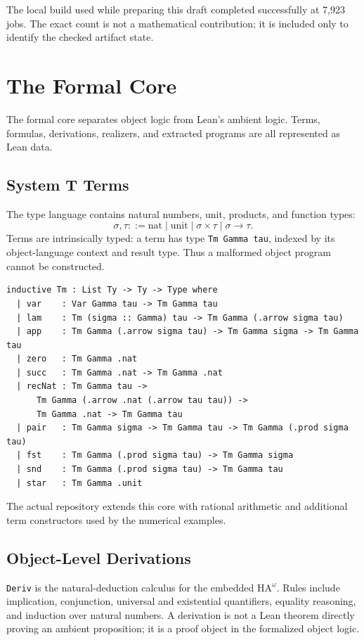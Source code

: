 \documentclass[11pt,a4paper]{article}
\theoremstyle{definition}
\theoremstyle{remark}
\newcommand{\HAomega}{\ensuremath{\mathrm{HA}^{\omega}}}
\newcommand{\lean}[1]{\texttt{\nolinkurl{#1}}}
\begin{document}
The local build used while preparing this draft completed successfully at
7,923 jobs.  The exact count is not a mathematical contribution; it is included
only to identify the checked artifact state.

\section{The Formal Core}

The formal core separates object logic from Lean's ambient logic.  Terms,
formulas, derivations, realizers, and extracted programs are all represented as
Lean data.

\subsection{System T Terms}

The type language contains natural numbers, unit, products, and function
types:
\[
  \sigma,\tau ::= \mathrm{nat}\mid \mathrm{unit}\mid
  \sigma\times\tau\mid \sigma\to\tau .
\]
Terms are intrinsically typed: a term has type \lean{Tm Gamma tau}, indexed by
its object-language context and result type.  Thus a malformed object program
cannot be constructed.

\begin{lstlisting}[language=Lean]
inductive Tm : List Ty -> Ty -> Type where
  | var    : Var Gamma tau -> Tm Gamma tau
  | lam    : Tm (sigma :: Gamma) tau -> Tm Gamma (.arrow sigma tau)
  | app    : Tm Gamma (.arrow sigma tau) -> Tm Gamma sigma -> Tm Gamma tau
  | zero   : Tm Gamma .nat
  | succ   : Tm Gamma .nat -> Tm Gamma .nat
  | recNat : Tm Gamma tau ->
      Tm Gamma (.arrow .nat (.arrow tau tau)) ->
      Tm Gamma .nat -> Tm Gamma tau
  | pair   : Tm Gamma sigma -> Tm Gamma tau -> Tm Gamma (.prod sigma tau)
  | fst    : Tm Gamma (.prod sigma tau) -> Tm Gamma sigma
  | snd    : Tm Gamma (.prod sigma tau) -> Tm Gamma tau
  | star   : Tm Gamma .unit
\end{lstlisting}

The actual repository extends this core with rational arithmetic and additional
term constructors used by the numerical examples.

\subsection{Object-Level Derivations}

\lean{Deriv} is the natural-deduction calculus for the embedded \HAomega.
Rules include implication, conjunction, universal and existential quantifiers,
equality reasoning, and induction over natural numbers.  A derivation is not a
Lean theorem directly proving an ambient proposition; it is a proof object in
the formalized object logic.
\end{document}

